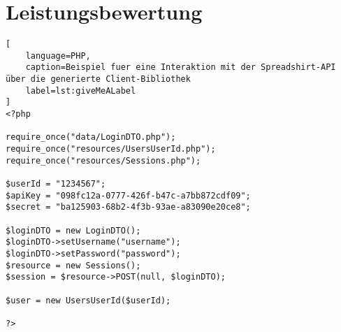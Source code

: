 \section{Leistungsbewertung}
\label{sec:performance_measurement}

\begin{lstlisting}[
    language=PHP,
    caption=Beispiel fuer eine Interaktion mit der Spreadshirt-API über die generierte Client-Bibliothek
    label=lst:giveMeALabel
]
<?php

require_once("data/LoginDTO.php");
require_once("resources/UsersUserId.php");
require_once("resources/Sessions.php");

$userId = "1234567";
$apiKey = "098fc12a-0777-426f-b47c-a7bb872cdf09";
$secret = "ba125903-68b2-4f3b-93ae-a83090e20ce8";

$loginDTO = new LoginDTO();
$loginDTO->setUsername("username");
$loginDTO->setPassword("password");
$resource = new Sessions();
$session = $resource->POST(null, $loginDTO);

$user = new UsersUserId($userId);

?>
\end{lstlisting}

